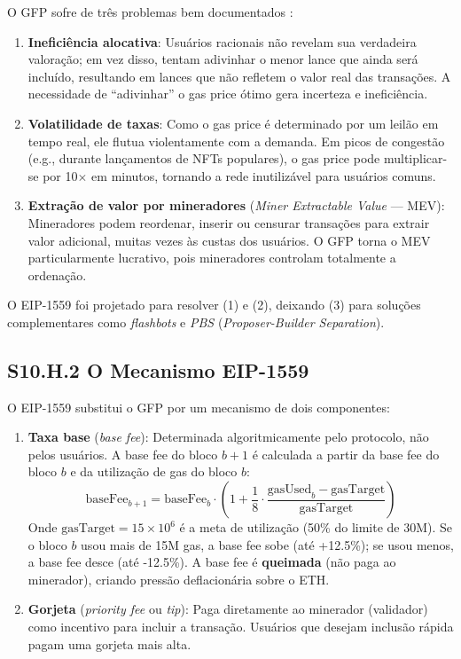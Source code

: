 O GFP sofre de três problemas bem documentados \cite{roughgarden2021transaction, buterin2019eip1559}:

\begin{enumerate}
    \item \textbf{Ineficiência alocativa}: Usuários racionais não revelam sua verdadeira valoração; em vez disso, tentam adivinhar o menor lance que ainda será incluído, resultando em lances que não refletem o valor real das transações. A necessidade de ``adivinhar'' o gas price ótimo gera incerteza e ineficiência.
    
    \item \textbf{Volatilidade de taxas}: Como o gas price é determinado por um leilão em tempo real, ele flutua violentamente com a demanda. Em picos de congestão (e.g., durante lançamentos de NFTs populares), o gas price pode multiplicar-se por 10$\times$ em minutos, tornando a rede inutilizável para usuários comuns.
    
    \item \textbf{Extração de valor por mineradores} (\textit{Miner Extractable Value} --- MEV): Mineradores podem reordenar, inserir ou censurar transações para extrair valor adicional, muitas vezes às custas dos usuários. O GFP torna o MEV particularmente lucrativo, pois mineradores controlam totalmente a ordenação.
\end{enumerate}

O EIP-1559 foi projetado para resolver (1) e (2), deixando (3) para soluções complementares como \textit{flashbots} e \textit{PBS} (\textit{Proposer-Builder Separation}).

\subsection*{S10.H.2 O Mecanismo EIP-1559}

O EIP-1559 substitui o GFP por um mecanismo de dois componentes:

\begin{enumerate}
    \item \textbf{Taxa base} (\textit{base fee}): Determinada algoritmicamente pelo protocolo, não pelos usuários. A base fee do bloco $b+1$ é calculada a partir da base fee do bloco $b$ e da utilização de gas do bloco $b$:
    \begin{equation}\label{eq:eip1559_basefee}
    \text{baseFee}_{b+1} = \text{baseFee}_b \cdot \left(1 + \frac{1}{8} \cdot \frac{\text{gasUsed}_b - \text{gasTarget}}{\text{gasTarget}}\right)
    \end{equation}
    Onde $\text{gasTarget} = 15 \times 10^6$ é a meta de utilização (50\% do limite de 30M). Se o bloco $b$ usou mais de 15M gas, a base fee sobe (até +12.5\%); se usou menos, a base fee desce (até -12.5\%). A base fee é \textbf{queimada} (não paga ao minerador), criando pressão deflacionária sobre o ETH.
    
    \item \textbf{Gorjeta} (\textit{priority fee} ou \textit{tip}): Paga diretamente ao minerador (validador) como incentivo para incluir a transação. Usuários que desejam inclusão rápida pagam uma gorjeta mais alta.
\end{enumerate}

